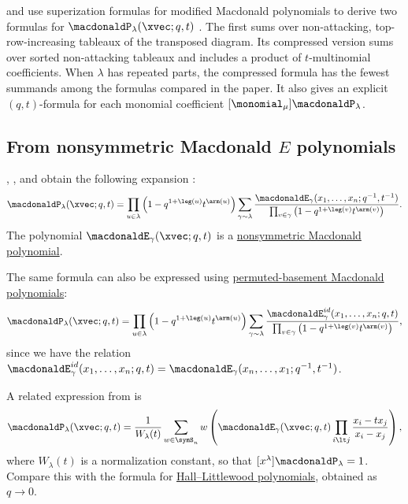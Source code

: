  and  use superization formulas for
modified Macdonald polynomials to derive two formulas for
$\macdonaldP_\lambda(\xvec;q,t)$ \cite[Thms.~1.3--1.4]{JinLin2026x}.
The first sums over non-attacking, top-row-increasing tableaux of the
transposed diagram.  Its compressed version sums over sorted non-attacking
tableaux and includes a product of $t$-multinomial coefficients.  When
$\lambda$ has repeated parts, the compressed formula has the fewest summands
among the formulas compared in the paper.  It also gives an explicit
$(q,t)$-formula for each monomial coefficient
$[\monomial_\mu]\macdonaldP_\lambda$.


\subsection[macdonaldPFromE]{From nonsymmetric Macdonald $E$ polynomials}


, , and  obtain the
following expansion \cite[Prop.~5.3.1]{HaglundHaimanLoehr2008}:
\begin{equation*}
\macdonaldP_\lambda(\xvec;q,t)
=
\prod_{u \in \lambda} \left(1- q^{1+\leg(u)}t^{\arm(u)}\right)
\sum_{\gamma \sim \lambda}
\frac{ \macdonaldE_{\gamma}(x_1,\dotsc,x_n;q^{-1},t^{-1})}{
\prod_{v \in \gamma} \left(1- q^{1+\leg(v)}t^{\arm(v)}\right)
}.
\end{equation*}
The polynomial $\macdonaldE_{\gamma}(\xvec;q,t)$
is a \hyperref[macdonaldE]{nonsymmetric Macdonald polynomial}.

The same formula can also be expressed using
\hyperref[macdonaldEperm]{permuted-basement Macdonald polynomials}:
\begin{equation*}
\macdonaldP_\lambda(\xvec;q,t)
=
\prod_{u \in \lambda} \left(1- q^{1+\leg(u)}t^{\arm(u)}\right)
\sum_{\gamma \sim \lambda}
\frac{ \macdonaldE^{id}_{\gamma}(x_1,\dotsc,x_n;q,t)}{
\prod_{v \in \gamma} \left(1- q^{1+\leg(v)}t^{\arm(v)}\right)
},
\end{equation*}
since we have the relation
$\macdonaldE^{id}_{\gamma}(x_1,\dotsc,x_n;q,t)
= \macdonaldE_{\gamma}(x_n,\dotsc,x_1;q^{-1},t^{-1})$.

A related expression from \cite{ColmenarejoRam2022x} is
\begin{equation*}
\macdonaldP_\lambda(\xvec;q,t) = \frac{1}{W_\lambda(t)}
\sum_{w \in \symS_n} w \left( \macdonaldE_{\gamma}(\xvec;q,t)
\prod_{i \lt j} \frac{x_i - t x_j}{x_i - x_j}
\right),
\end{equation*}
where $W_\lambda(t)$ is a normalization constant, so that
$[x^{\lambda}] \macdonaldP_\lambda =1$.
Compare this with the formula for
\hyperref[hallLittlewoodP]{Hall--Littlewood polynomials}, obtained as
$q\to 0$.

